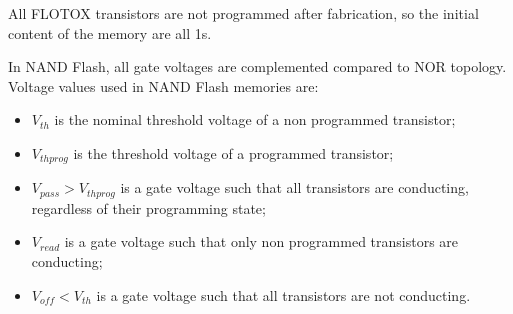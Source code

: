 \documentclass[a4paper,11pt]{article}
\begin{document}
All FLOTOX transistors are not programmed after fabrication, so the initial content of the memory are all 1s.

In NAND Flash, all gate voltages are complemented compared to NOR topology.
Voltage values used in NAND Flash memories are:
\begin{itemize}
	\item $V_{th}$ is the nominal threshold voltage of a non programmed transistor;
	\item $V_{thprog}$ is the threshold voltage of a programmed transistor;
	\item $V_{pass} > V_{thprog}$ is a gate voltage such that all transistors are conducting, regardless of their programming state;
	\item $V_{read}$ is a gate voltage such that only non programmed transistors are conducting;
	\item $V_{off} < V_{th}$ is a gate voltage such that all transistors are not conducting.
\end{itemize}
\end{document}
